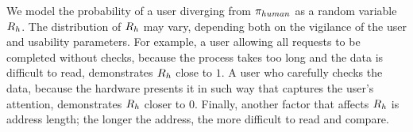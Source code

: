 We model the probability of a user diverging from $\pi_{human}$ as a random variable
$R_{h}$.  The distribution of $R_{h}$ may vary, depending both on the
vigilance of the user and usability parameters. For example, a user allowing
all requests to be completed without checks, \eg because the process takes too
long and the data is difficult to read, demonstrates $R_{h}$ close to $1$. A
user who carefully checks the data, \eg because the hardware presents it in
such way that captures the user's attention, demonstrates $R_{h}$ closer to
$0$. Finally, another factor that affects $R_{h}$ is address length; the
longer the address, the more difficult to read and compare.
